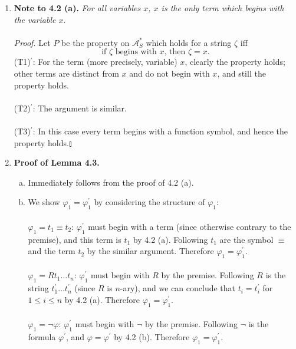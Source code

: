 \begin{enumerate}[1.]
\\
(T3)$^\prime$: $t = f t_1 \ldots t_n$ for some $n$-ary function symbol $f$ and $t_1$, \ldots, $t_n$ are terms. By induction hypothesis each of $t_1$, \ldots, $t_n$ contains no left or right parenthesis. At the same time, $f$ is distinct from left parenthesis ( and right parenthesis ). It turns out that $t$ contains no left or right parenthesis.\nolinebreak\hfill$\talloblong$
%
\item \textbf{Note to 4.2 (a).} \textit{For all variables $x$, $x$ is the only term which begins with the variable $x$}.\\
\\
\textit{Proof.} Let $P$ be the property on $\mathcal{A}_S^*$ which holds for a string $\zeta$ iff
\[
\mbox{if } \zeta \mbox{ begins with } x \mbox{, then } \zeta = x.
\]
(T1)$^\prime$: For the term (more precisely, variable) $x$, clearly the property holds; other terms are distinct from $x$ and do not begin with $x$, and still the property holds.\\
\\
(T2)$^\prime$: The argument is similar.\\
\\
(T3)$^\prime$: In this case every term begins with a function symbol, and hence the property holds.\nolinebreak\hfill$\talloblong$
%
\item \textbf{Proof of Lemma 4.3.}
\begin{enumerate}[(a)]
\item Immediately follows from the proof of 4.2 (a).
\item We show $\varphi_1 = \varphi_1^\prime$ by considering the structure of $\varphi_1$: \\
\ 
\\ $\varphi_1 = t_1 \equiv t_2$: $\varphi_1^\prime$ must begin with a term (since otherwise contrary to the premise), and this term is $t_1$ by 4.2 (a). Following $t_1$ are the symbol $\equiv$ and the term $t_2$ by the similar argument. Therefore $\varphi_1 = \varphi_1^\prime$. \\
\ 
\\ $\varphi_1 = Rt_1 \ldots t_n$: $\varphi_1^\prime$ must begin with $R$ by the premise. Following $R$ is the string $t_1^\prime \ldots t_n^\prime$ (since $R$ is $n$-ary), and we can conclude that $t_i = t_i^\prime$ for $1 \leq i \leq n$ by 4.2 (a). Therefore $\varphi_1 = \varphi_1^\prime$. \\
\ 
\\ $\varphi_1 = \neg \varphi$: $\varphi_1^\prime$ must begin with $\neg$ by the premise. Following $\neg$ is the formula $\varphi^\prime$, and $\varphi = \varphi^\prime$ by 4.2 (b). Therefore $\varphi_1 = \varphi_1^\prime$. \\

\end{enumerate}
\end{enumerate}
